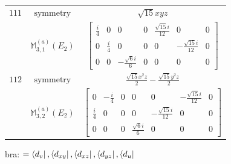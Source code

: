 \documentclass[fleqn,8pt,landscape]{jsarticle}
\begin{document}
\begin{longtable}{ccc}
$ 111 $ & $ \text{symmetry} $ & $ \sqrt{15} x y z $ \\
$  $ & $ \mathbb{M}_{3,1}^{(a)}(E_{2}) $ & $ \begin{bmatrix} \frac{i}{4} & 0 & 0 & 0 & \frac{\sqrt{15} i}{12} & 0 & 0 \\ 0 & \frac{i}{4} & 0 & 0 & 0 & - \frac{\sqrt{15} i}{12} & 0 \\ 0 & 0 & - \frac{\sqrt{6} i}{6} & 0 & 0 & 0 & 0 \end{bmatrix} $ \\ \hline
$ 112 $ & $ \text{symmetry} $ & $ \frac{\sqrt{15} x^{2} z}{2} - \frac{\sqrt{15} y^{2} z}{2} $ \\
$  $ & $ \mathbb{M}_{3,2}^{(a)}(E_{2}) $ & $ \begin{bmatrix} 0 & - \frac{i}{4} & 0 & 0 & 0 & - \frac{\sqrt{15} i}{12} & 0 \\ \frac{i}{4} & 0 & 0 & 0 & - \frac{\sqrt{15} i}{12} & 0 & 0 \\ 0 & 0 & 0 & \frac{\sqrt{6} i}{6} & 0 & 0 & 0 \end{bmatrix} $ \\ \hline
\end{longtable}
bra: $=\bra{d_{v}}, \bra{d_{xy}}, \bra{d_{xz}}, \bra{d_{yz}}, \bra{d_{u}}$
\end{document}

